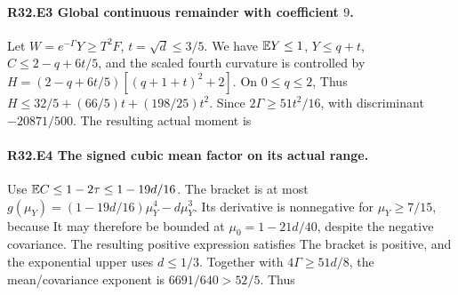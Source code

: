 \paragraph{R32.E3 Global continuous remainder with coefficient \(9\).}
Let \(W=e^{-\Gamma}Y\ge T^2F\), \(t=\sqrt d\le3/5\).
We have \(\mathbb E Y\le1\), \(Y\le q+t\), \(C\le2-q+6t/5\), and the
scaled fourth curvature is controlled by
\(H=(2-q+6t/5)[(q+1+t)^2+2]\). On \(0\le q\le2\),
Thus \(H\le32/5+(66/5)t+(198/25)t^2\). Since \(2\Gamma\ge51t^2/16\),
with discriminant \(-20871/500\). The resulting actual moment is

\paragraph{R32.E4 The signed cubic mean factor on its actual range.}
Use \(\mathbb E C\le1-2\tau\le1-19d/16\). The bracket is at most
\(g(\mu_Y)=(1-19d/16)\mu_Y^4-d\mu_Y^3\). Its derivative is nonnegative
for \(\mu_Y\ge7/15\), because
It may therefore be bounded at \(\mu_0=1-21d/40\), despite the negative
covariance. The resulting positive expression satisfies
The bracket is positive, and the exponential upper uses \(d\le1/3\).
Together with \(4\Gamma\ge51d/8\), the mean/covariance exponent is
\(6691/640>52/5\). Thus

